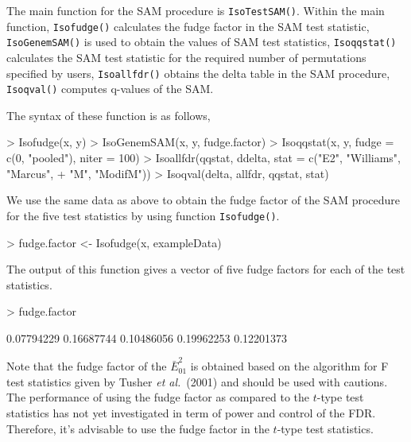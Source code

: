 \documentclass[10pt]{mybook4}
\begin{document}
The main function for the SAM procedure is \texttt{IsoTestSAM()}. Within the main function, \texttt{Isofudge()}
calculates the fudge factor in the SAM test statistic, \texttt{IsoGenemSAM()} is used
to obtain the values of SAM test statistics, \texttt{Isoqqstat()} calculates the SAM test statistic
for the required number of permutations specified by users, \texttt{Isoallfdr()} obtains the delta table in the SAM procedure,
\texttt{Isoqval()} computes q-values of the SAM.  %

The syntax of these function is as follows,

\begin{Schunk}
\begin{Sinput}
> Isofudge(x, y)
> IsoGenemSAM(x, y, fudge.factor)
> Isoqqstat(x, y, fudge = c(0, "pooled"), niter = 100)
> Isoallfdr(qqstat, ddelta, stat = c("E2", "Williams", "Marcus", 
+     "M", "ModifM"))
> Isoqval(delta, allfdr, qqstat, stat)
\end{Sinput}
\end{Schunk}

We use the same data as above to obtain the fudge factor of the SAM procedure for
the five test statistics by using function \texttt{Isofudge()}.

\begin{Schunk}
\begin{Sinput}
> fudge.factor <- Isofudge(x, exampleData)
\end{Sinput}
\end{Schunk}

The output of this function gives a vector of five fudge factors for each of the test statistics.

\begin{Schunk}
\begin{Sinput}
> fudge.factor
\end{Sinput}
\begin{Soutput}
[1] 0.07794229 0.16687744 0.10486056 0.19962253 0.12201373
\end{Soutput}
\end{Schunk}

Note that the fudge factor of the $\bar{E}_{01}^2$ is obtained based on the algorithm for F test
statistics given by Tusher \textit{et al.}\ (2001) and should be used with cautions. The performance of using
the fudge factor as compared to the $t$-type test statistics has not yet investigated in term of
power and control of the FDR. Therefore, it's advisable to use the fudge factor in the $t$-type test statistics.
\end{document}
